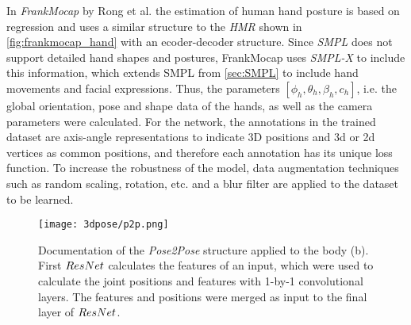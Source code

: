 In \emph{FrankMocap} by Rong et al. \cite{frankmocap} the estimation of human hand posture is based on regression and uses a similar structure to the \emph{HMR} shown in \autoref{fig:frankmocap_hand} with an ecoder-decoder structure. Since \emph{SMPL} does not support detailed hand shapes and postures, FrankMocap uses \emph{SMPL-X} to include this information, which extends SMPL from \autoref{sec:SMPL} to include hand movements and facial expressions. Thus, the parameters $[\phi_{h},\theta_{h},\beta_{h},c_{h}]$, i.e. the global orientation, pose and shape data of the hands, as well as the camera parameters were calculated. For the network, the annotations in the trained dataset are axis-angle representations to indicate 3D positions and 3d or 2d vertices as common positions, and therefore each annotation has its unique loss function. To increase the robustness of the model, data augmentation techniques such as random scaling, rotation, etc. and a blur filter are applied to the dataset to be learned.

\begin{figure}[h]
	\centering
	\texttt{[image: 3dpose/p2p.png]}
	\caption{Documentation of the \emph{Pose2Pose} structure applied to the body (b). First $\protect ResNet$ calculates the features of an input, which were used to calculate the joint positions and features with 1-by-1 convolutional layers. The features and positions were merged as input to the final layer of $\protect ResNet$.}
	\label{fig:p2p}
\end{figure}

